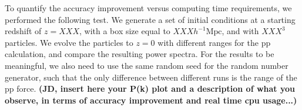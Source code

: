  To quantify the accuracy improvement versus computing time requirements, we performed the following test.
 We generate a set of initial conditions at a starting redshift of $z = XXX$, with a box size equal to $ XXX h^{-1}\mbox{Mpc}$,
 and with $XXX^{3}$ particles. We evolve the particles to $z=0$ with different ranges for the pp calculation, and compare 
 the resulting power spectra. For the results to be meaningful, we also need to use the same random seed for the random number generator,
 such that the only difference between different runs is the range of the pp force.
{\bf (JD, insert here your P(k) plot and a description of what you observe, in terms of accuracy improvement and real time cpu usage...)}
